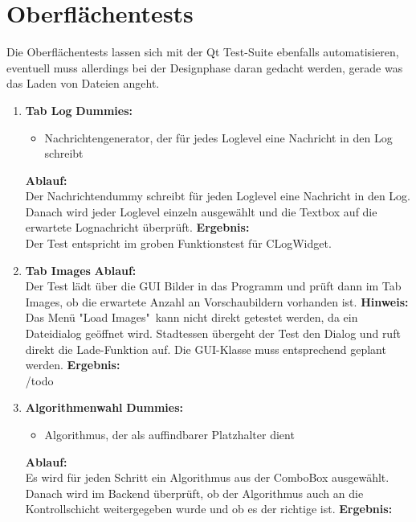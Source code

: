 \section{Oberflächentests}
Die Oberflächentests lassen sich mit der Qt Test-Suite ebenfalls automatisieren, eventuell muss allerdings bei der Designphase daran gedacht werden, gerade was das Laden von Dateien angeht.\\
\begin{enumerate}[align=left, leftmargin=4em, label={\textbf{\textbackslash T3.\arabic*\textbackslash}} ]
	\item \textbf{Tab Log}
	\subitem\textbf{Dummies:} \begin{itemize}
		\item Nachrichtengenerator, der für jedes Loglevel eine Nachricht in den Log schreibt
	\end{itemize}
	\subitem\textbf{Ablauf:}\\ Der Nachrichtendummy schreibt für jeden Loglevel eine Nachricht in den Log. Danach wird jeder Loglevel einzeln ausgewählt und die Textbox auf die erwartete Lognachricht überprüft.
	\subitem\textbf{Ergebnis:}\\
	Der Test entspricht im groben Funktionstest für CLogWidget.
	\\\item \textbf{Tab Images}
	\subitem \textbf{Ablauf:}\\ Der Test lädt über die GUI Bilder in das Programm und prüft dann im Tab Images, ob die erwartete Anzahl an Vorschaubildern vorhanden ist.
	\subitem \textbf{Hinweis:}\\
	Das Menü "{}Load Images" kann nicht direkt getestet werden, da ein Dateidialog geöffnet wird. Stadtessen übergeht der Test den Dialog und ruft direkt die Lade-Funktion auf. Die GUI-Klasse muss entsprechend geplant werden.
	\subitem\textbf{Ergebnis:}\\
	/todo
	\\\item \textbf{Algorithmenwahl}
	\subitem \textbf{Dummies:}\begin{itemize}
		\item Algorithmus, der als auffindbarer Platzhalter dient
	\end{itemize}
	\subitem \textbf{Ablauf:}\\ Es wird für jeden Schritt ein Algorithmus aus der ComboBox ausgewählt. Danach wird im Backend überprüft, ob der Algorithmus auch an die Kontrollschicht weitergegeben wurde und ob es der richtige ist.
	\subitem\textbf{Ergebnis:}\\

\end{enumerate}
